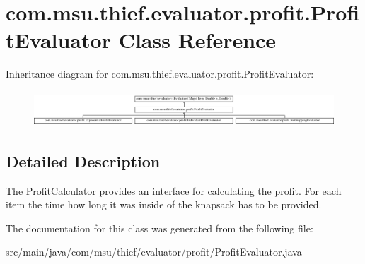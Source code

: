 \hypertarget{classcom_1_1msu_1_1thief_1_1evaluator_1_1profit_1_1ProfitEvaluator}{\section{com.\-msu.\-thief.\-evaluator.\-profit.\-Profit\-Evaluator Class Reference}
\label{classcom_1_1msu_1_1thief_1_1evaluator_1_1profit_1_1ProfitEvaluator}
}
Inheritance diagram for com.\-msu.\-thief.\-evaluator.\-profit.\-Profit\-Evaluator\-:\begin{figure}[H]
\begin{center}
\leavevmode
\includegraphics[height=1.346154cm]{classcom_1_1msu_1_1thief_1_1evaluator_1_1profit_1_1ProfitEvaluator}
\end{center}
\end{figure}


\subsection{Detailed Description}
The Profit\-Calculator provides an interface for calculating the profit. For each item the time how long it was inside of the knapsack has to be provided. 

The documentation for this class was generated from the following file\-:\begin{DoxyCompactItemize}
\item 
src/main/java/com/msu/thief/evaluator/profit/Profit\-Evaluator.\-java\end{DoxyCompactItemize}
